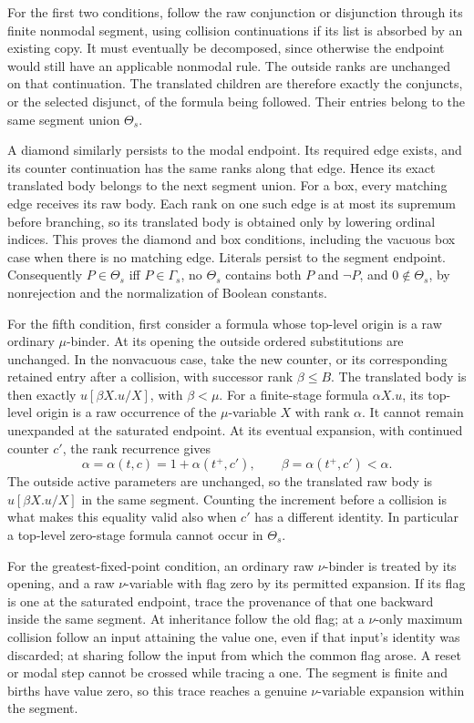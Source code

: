 For the first two conditions, follow the raw
conjunction or disjunction through its finite
nonmodal segment, using collision continuations if
its list is absorbed by an existing copy. It must
eventually be decomposed, since otherwise the endpoint
would still have an applicable nonmodal rule. The
outside ranks are unchanged on that continuation.
The translated children are therefore exactly the
conjuncts, or the selected disjunct, of the formula
being followed. Their entries belong to the same
segment union \(\Theta_s\).

A diamond similarly persists to the modal endpoint.
Its required edge exists, and its counter continuation
has the same ranks along that edge. Hence its exact
translated body belongs to the next segment union.
For a box, every matching edge receives its raw
body. Each rank on one such edge is at most its
supremum before branching, so its translated body
is obtained only by lowering ordinal indices.
This proves the diamond and box conditions, including
the vacuous box case when there is no matching edge.
Literals persist to the segment endpoint. Consequently
\(P\in\Theta_s\) iff \(P\in\Gamma_s\), no
\(\Theta_s\) contains both \(P\) and \(\neg P\),
and \(0\notin\Theta_s\), by nonrejection and
the normalization of Boolean constants.

For the fifth condition, first consider a formula
whose top-level origin is a raw ordinary
\(\mu\)-binder. At its opening the outside
ordered substitutions are unchanged. In the
nonvacuous case, take the new counter, or its
corresponding retained entry after a collision,
with successor rank \(\beta\leq B\). The
translated body is then exactly
\(u[\beta X.u/X]\), with \(\beta<\mu\).
For a finite-stage formula \(\alpha X.u\), its
top-level origin is a raw occurrence of the
\(\mu\)-variable \(X\) with rank \(\alpha\).
It cannot remain unexpanded at the saturated
endpoint. At its eventual expansion, with continued
counter \(c'\), the rank recurrence gives
\[
 \alpha=\alpha(t,c)=1+\alpha(t^+,c'),
 \qquad \beta=\alpha(t^+,c')<\alpha.
\]
The outside active parameters are unchanged, so the
translated raw body is \(u[\beta X.u/X]\) in the
same segment. Counting the increment before a
collision is what makes this equality valid also
when \(c'\) has a different identity. In particular
a top-level zero-stage formula cannot occur in
\(\Theta_s\).

For the greatest-fixed-point condition, an ordinary
raw \(\nu\)-binder is treated by its opening, and
a raw \(\nu\)-variable with flag zero by its
permitted expansion. If its flag is one at the
saturated endpoint, trace the provenance of that
one backward inside the same segment. At inheritance
follow the old flag; at a \(\nu\)-only maximum
collision follow an input attaining the value one,
even if that input's identity was discarded; at
sharing follow the input from which the common flag
arose. A reset or modal step cannot be crossed while
tracing a one. The segment is finite and births have
value zero, so this trace reaches a genuine
\(\nu\)-variable expansion within the segment.


